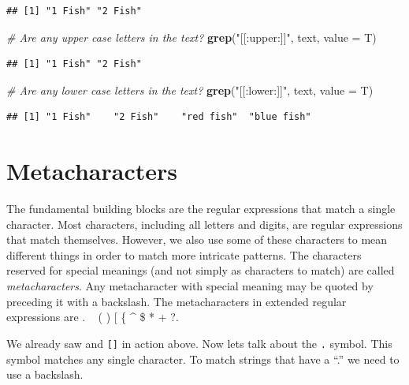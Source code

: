 \documentclass[
]{book}
\newenvironment{Shaded}{\begin{snugshade}}{\end{snugshade}}
\newcommand{\CommentTok}[1]{\textcolor[rgb]{0.56,0.35,0.01}{\textit{#1}}}
\newcommand{\DataTypeTok}[1]{\textcolor[rgb]{0.13,0.29,0.53}{#1}}
\newcommand{\KeywordTok}[1]{\textcolor[rgb]{0.13,0.29,0.53}{\textbf{#1}}}
\newcommand{\NormalTok}[1]{#1}
\newcommand{\StringTok}[1]{\textcolor[rgb]{0.31,0.60,0.02}{#1}}
\begin{document}
\begin{verbatim}
## [1] "1 Fish" "2 Fish"
\end{verbatim}

\begin{Shaded}
\begin{Highlighting}[]
\CommentTok{# Are any upper case letters in the text?}
\KeywordTok{grep}\NormalTok{(}\StringTok{"[[:upper:]]"}\NormalTok{, text, }\DataTypeTok{value =}\NormalTok{ T)}
\end{Highlighting}
\end{Shaded}

\begin{verbatim}
## [1] "1 Fish" "2 Fish"
\end{verbatim}

\begin{Shaded}
\begin{Highlighting}[]
\CommentTok{# Are any lower case letters in the text?}
\KeywordTok{grep}\NormalTok{(}\StringTok{"[[:lower:]]"}\NormalTok{, text, }\DataTypeTok{value =}\NormalTok{ T)}
\end{Highlighting}
\end{Shaded}

\begin{verbatim}
## [1] "1 Fish"    "2 Fish"    "red fish"  "blue fish"
\end{verbatim}

\hypertarget{metacharacters}{%
\section{Metacharacters}\label{metacharacters}}

The fundamental building blocks are the regular expressions that match a single character. Most characters, including all letters and digits, are regular expressions that match themselves. However, we also use some of these characters to mean different things in order to match more intricate patterns. The characters reserved for special meanings (and not simply as characters to match) are called \emph{metacharacters}. Any metacharacter with special meaning may be quoted by preceding it with a backslash. The metacharacters in extended regular expressions are . ~\textbar{} ( ) {[} \{ \^{} \$ * + ?.

We already saw \texttt{\textbar{}} and \texttt{{[}{]}} in action above. Now lets talk about the \texttt{.} symbol. This symbol matches any single character. To match strings that have a ``.'' we need to use a backslash.
\end{document}
